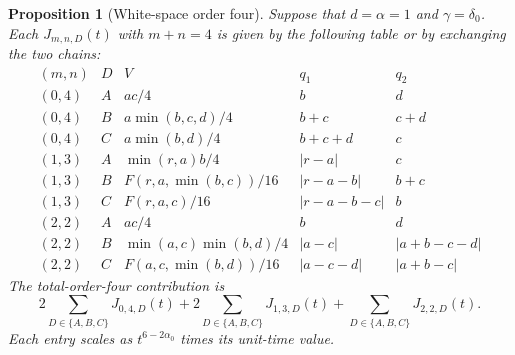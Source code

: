 \documentclass[12pt]{article}
\numberwithin{equation}{section}
\newtheorem{proposition}[theorem]{Proposition}
\theoremstyle{definition}
\begin{document}
\begin{proposition}[White-space order four]\label{P:white-four}
  Suppose that $d=\alpha=1$ and $\gamma=\delta_0$. Each
  $J_{m,n,D}(t)$ with $m+n=4$ is given by the following table or by
  exchanging the two chains:
  \begin{equation}\label{E:white-four-table}
    \begin{array}{c|c|c|c|c}
      (m,n)&D&V&q_1&q_2\\ \hline
      (0,4)&A&ac/4&b&d\\
      (0,4)&B&a\min(b,c,d)/4&b+c&c+d\\
      (0,4)&C&a\min(b,d)/4&b+c+d&c\\ \hline
      (1,3)&A&\min(r,a)b/4&|r-a|&c\\
      (1,3)&B&F(r,a,\min(b,c))/16&|r-a-b|&b+c\\
      (1,3)&C&F(r,a,c)/16&|r-a-b-c|&b\\ \hline
      (2,2)&A&ac/4&b&d\\
      (2,2)&B&\min(a,c)\min(b,d)/4&|a-c|&|a+b-c-d|\\
      (2,2)&C&F(a,c,\min(b,d))/16&|a-c-d|&|a+b-c|
    \end{array}
  \end{equation}
  The total-order-four contribution is
  \begin{equation}\label{E:total-four}
    2\sum_{D\in\{A,B,C\}}J_{0,4,D}(t)
    +2\sum_{D\in\{A,B,C\}}J_{1,3,D}(t)
    +\sum_{D\in\{A,B,C\}}J_{2,2,D}(t).
  \end{equation}
  Each entry scales as $t^{6-2\alpha_0}$ times its unit-time value.
\end{proposition}
\end{document}
